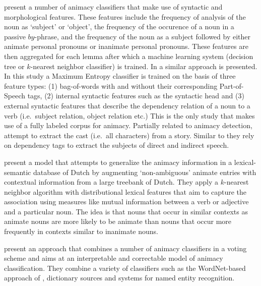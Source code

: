 \documentclass[a4paper,UKenglish]{oasics}
\begin{document}
\cite{ovrelid:04,ovrelid:05,ovrelid:06,ovrelid:08,ovrelid:09} present
a number of animacy classifiers that make use of syntactic and
morphological features. These features include the frequency of
analysis of the noun as `subject' or `object', the frequency of the
occurence of a noun in a passive $by$-phrase, and the frequency of the
noun as a subject followed by either animate personal pronouns or
inanimate personal pronouns. These features are then aggregated for
each lemma after which a machine learning system (decision tree or
$k$-nearest neighbor classifier) is trained. In \cite{bowman:12} a
similar approach is presented. In this study a Maximum Entropy
classifier is trained on the basis of three feature types: (1)
bag-of-words with and without their corresponding Part-of-Speech tags,
(2) internal syntactic features such as the syntactic head and (3)
external syntactic features that describe the dependency relation of a
noun to a verb (i.e.\ subject relation, object relation etc.)  This is
the only study that makes use of a fully labeled corpus for animacy.
Partially related to animacy detection, \cite{karsdorp:12}
attempt to extract the cast (i.e.\ all characters) from a
story. Similar to \cite{bowman:12} they rely on dependency tags to
extract the subjects of direct and indirect speech.

\cite{bloem:13} present a model that attempts to generalize the
animacy information in a lexical-semantic database of Dutch by
augmenting `non-ambiguous' animate entries with contextual information
from a large treebank of Dutch. They apply a $k$-nearest neighbor
algorithm with distributional lexical features that aim to capture the
association using measures like mutual information between a verb or
adjective and a particular noun. The idea is that nouns that occur in
similar contexts as animate nouns are more likely to be animate than
nouns that occur more frequently in contexts similar to inanimate nouns.

\cite{moore:13} present an approach that combines a number of animacy
classifiers in a voting scheme and aims at an interpretable and
correctable model of animacy classification. They combine a variety of
classifiers such as the WordNet-based approach of \cite{evans:00},
dictionary sources and systems for named entity recognition.
\end{document}
